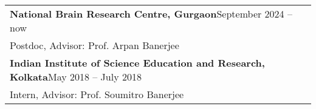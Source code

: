 

\noindent
\begin{tabular}{@{} m{18.5cm}}
\textbf{National Brain Research Centre, Gurgaon}\hfill September 2024 -- now\\
Postdoc, Advisor: Prof. Arpan Banerjee\\[0.3cm]

\textbf{Indian Institute of Science Education and Research, Kolkata}\hfill May 2018 -- July 2018 \\
Intern, Advisor: Prof. Soumitro Banerjee\\
\end{tabular}